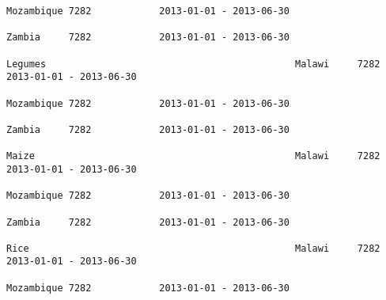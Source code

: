 \documentclass[11pt]{article}
\begin{document}
\begin{Verbatim}[commandchars=\\\{\}]
                                                                                                                                                                                                                 Mozambique 7282            2013-01-01 - 2013-06-30   
                                                                                                                                                                                                                 Zambia     7282            2013-01-01 - 2013-06-30   
                                                                                                                                                              Legumes                                            Malawi     7282            2013-01-01 - 2013-06-30   
                                                                                                                                                                                                                 Mozambique 7282            2013-01-01 - 2013-06-30   
                                                                                                                                                                                                                 Zambia     7282            2013-01-01 - 2013-06-30   
                                                                                                                                                              Maize                                              Malawi     7282            2013-01-01 - 2013-06-30   
                                                                                                                                                                                                                 Mozambique 7282            2013-01-01 - 2013-06-30   
                                                                                                                                                                                                                 Zambia     7282            2013-01-01 - 2013-06-30   
                                                                                                                                                              Rice                                               Malawi     7282            2013-01-01 - 2013-06-30   
                                                                                                                                                                                                                 Mozambique 7282            2013-01-01 - 2013-06-30   

\end{Verbatim}
\end{document}
